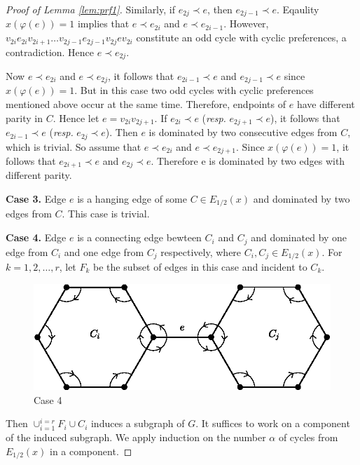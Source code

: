 \documentclass[11pt]{article}
\numberwithin{theorem}{section}
\begin{document}
\begin{proof}[Proof of Lemma \ref{lem:prf1}]
Similarly, if $e_{2j}\prec e$, then $e_{2j-1}\prec e$. Eqaulity $x(\varphi(e))=1$ implies that $e\prec e_{2i}$ and $e\prec e_{2i-1}$. However, $v_{2i} e_{2i} v_{2i+1} \ldots v_{2j-1} e_{2j-1} v_{2j} e v_{2i}$ constitute an odd cycle with cyclic preferences, a contradiction. Hence $e\prec e_{2j}$. 

Now $e\prec e_{2i}$ and $e\prec e_{2j}$, it follows that $e_{2i-1}\prec e$ and $e_{2j-1}\prec e$ since $x(\varphi(e))=1$. But in this case two odd cycles with cyclic preferences mentioned above occur at the same time. 
Therefore, endpoints of $e$ have different parity in $C$. Hence let $e=v_{2i} v_{2j+1}$.
If $e_{2i}\prec e$ (\textit{resp.} $e_{2j+1}\prec e$), it follows that $e_{2i-1}\prec e$ (\textit{resp.} $e_{2j}\prec e$). Then $e$ is dominated by two consecutive edges from $C$, which is trivial.  So assume that $e\prec e_{2i}$ and $e\prec e_{2j+1}$. Since $x(\varphi(e))=1$, it follows that $e_{2i+1}\prec e$ and $e_{2j}\prec e$. Therefore e is dominated by two edges with different parity.

\textbf{Case 3.} Edge $e$ is a hanging edge of some $C\in E_{1/2}(x)$ and dominated by two edges from $C$. This case is trivial.

\textbf{Case 4.} Edge $e$ is a connecting edge bewteen $C_i$ and $C_j$ and dominated by one edge from $C_i$ and one edge from $C_j$ respectively, where $C_i, C_j \in E_{1/2}(x)$.
For $k=1,2,\ldots,r$, let $F_k$ be the subset of edges in this case and incident to $C_k$.
\begin{figure}
\centering
\includegraphics[scale=0.85]{KernelMengerianO-fig2}
\caption{Case 4}
\end{figure}
Then $\cup_{i=1}^{i=r} F_i\cup C_i$ induces a subgraph of $G$. It suffices to work on a component of the induced subgraph. We apply induction on the number $\alpha$ of cycles from $E_{1/2}(x)$ in a component.


\end{proof}
\end{document}
